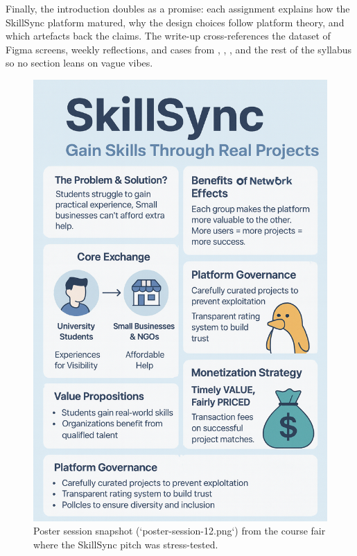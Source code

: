 \documentclass[12pt,a4paper]{article}
\begin{document}
Finally, the introduction doubles as a promise: each assignment explains how the SkillSync platform matured, why the design choices follow platform theory, and which artefacts back the claims. The write-up cross-references the dataset of Figma screens, weekly reflections, and cases from \citet{Choudary2016}, \citet{Srnicek2017}, \citet{Reillier2017}, and the rest of the syllabus so no section leans on vague vibes.

\begin{figure}[h]
  \centering
  \includegraphics[width=0.7\linewidth]{figures/introduction/poster-session-12.png}
  \caption{Poster session snapshot (`poster-session-12.png`) from the course fair where the SkillSync pitch was stress-tested.}
  \label{fig:intro-showcase}
\end{figure}












\newpage


\end{document}
